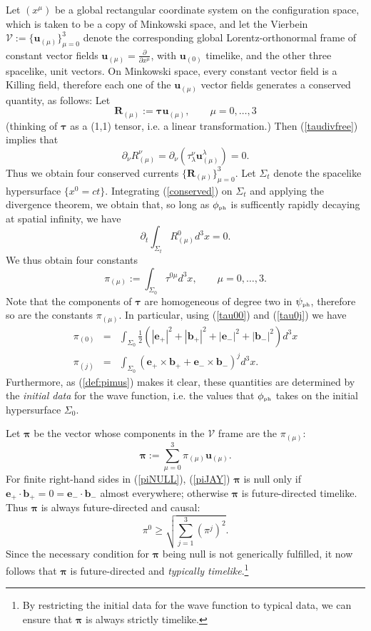 \documentclass[12pt]{article}
\theoremstyle{definition}
\newcommand{\refeq}[1]{(\ref{#1})}
\newcommand{\bpi}{\boldsymbol{\pi}}
\numberwithin{equation}{section}
\newcommand{\bb}{\mathbf{b}}
\newcommand{\be}{\mathbf{e}}
\newcommand{\bR}{\mathbf{R}}
\newcommand{\bu}{\mathbf{u}}
\newcommand{\btau}{\boldsymbol{\tau}}
\newcommand{\beq}{\begin{equation}}
\newcommand{\eeq}{\end{equation}}
\newcommand{\p}{\partial}
\newcommand{\cV}{\mathcal{V}}
\newcommand{\psiPH}{{\psi_{\mbox{\rm\tiny ph}}}}
\newcommand{\phiPH}{{\phi_{\mbox{\rm\tiny ph}}}}
\newcommand{\la}{\lambda}
\newcommand{\Si}{\Sigma}
\newcommand{\half}{\frac{1}{2}}
\newcommand{\bna}{\begin{eqnarray}}
\newcommand{\ena}{\end{eqnarray}}
\begin{document}
 Let $(x^\mu)$ be a global rectangular coordinate system on the configuration space, which is taken to be a copy of Minkowski space,
and let the Vierbein $\cV := \{\bu_{(\mu)}\}_{\mu = 0}^3$ denote the corresponding global Lorentz-orthonormal frame of constant vector fields 
$\bu_{(\mu)} = \frac{\p}{\p x^\mu}$, with $\bu_{(0)}$ timelike, and the other three spacelike, unit vectors. 
 On Minkowski space, every constant vector field is a Killing field, therefore each one of the $\bu_{(\mu)}$ 
vector fields generates a conserved quantity, as follows:  
 Let 
\beq
\bR_{(\mu)} := \btau \bu_{(\mu)},\qquad \mu = 0,\dots,3
\eeq
(thinking of $\btau$ as a (1,1) tensor, i.e. a linear transformation.) 
Then \refeq{taudivfree} implies that
\beq\label{conserved}
\p_\nu R_{(\mu)}^\nu = \p_\nu (\tau^{\nu}_\la \bu_{(\mu)}^\la) = 0.
\eeq
 Thus we obtain four conserved currents $\{ \bR_{(\mu)}\}_{\mu =0}^3$.  
 Let $\Si_t$ denote the spacelike hypersurface $\{ x^0 = ct\}$.  
 Integrating \refeq{conserved} on $\Si_t$ and applying the divergence theorem, we obtain that, so long as $\phiPH$ is sufficently 
rapidly decaying at spatial infinity, we have 
\beq
\p_t \int_{\Si_t} R_{(\mu)}^0 d^3x = 0.
\eeq
 We thus obtain four constants
\beq\label{def:pimus}
\pi_{(\mu)} := \int_{\Si_0} \tau^{0\mu} d^3 x,\qquad \mu = 0,\dots,3.
\eeq
 Note that the components of $\btau$ are homogeneous of degree two in $\psiPH$, therefore so are the constants $\pi_{(\mu)}$. 
 In particular, using \refeq{tau00} and \refeq{tau0j} we have
\bna\label{piNULL}
\pi_{(0)} & =& \int_{\Si_0} \half\left( |\be_+|^2 + |\bb_+|^2 + |\be_-|^2 + |\bb_-|^2\right) d^3x\\
\pi_{(j)} & = & \int_{\Si_0} \left(\be_+\times \bb_+ + \be_-\times\bb_- \right)^j d^3x.
\label{piJAY}
\ena
Furthermore, as \refeq{def:pimus} makes it clear, these quantities are determined by the {\em initial data} for the wave function, i.e. the values that $\phiPH$ takes on the initial hypersurface $\Si_0$.  

 Let $\bpi$ be the vector whose components in the $\cV$ frame are the $\pi_{(\mu)}$:
\beq
\bpi := \sum_{\mu=0}^3 \pi_{(\mu)} \bu_{(\mu)}.
\eeq
  For finite right-hand sides in \refeq{piNULL}, \refeq{piJAY} 
$\bpi$ is null only if $\be_+\cdot\bb_+=0=\be_-\cdot\bb_-$ almost everywhere; otherwise $\bpi$ is future-directed timelike. 
 Thus $\bpi$ is always future-directed and causal:
\beq
\pi^0 \geq \surd{ \textstyle{\sum\limits_{j=1}^3} (\pi^j)^2}.
\eeq
 Since the necessary condition for $\bpi$ being null is not generically fulfilled, it now follows that $\bpi$  is future-directed and \emph{typically timelike}.\footnote{By
   restricting the initial data for the wave function to typical data, we can ensure that $\bpi$ is always strictly timelike.}
\end{document}

